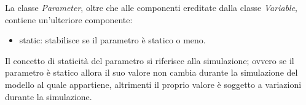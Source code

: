 
La classe \textit{Parameter}, oltre che alle componenti ereditate dalla classe \textit{Variable}, contiene un'ulteriore componente:
\begin{itemize}
	\item static: stabilisce se il parametro è statico o meno.
\end{itemize}
Il concetto di staticità del parametro si riferisce alla simulazione; ovvero se il parametro è statico allora il suo valore non cambia durante la simulazione del modello al quale appartiene, altrimenti il proprio valore è soggetto a variazioni durante la simulazione.